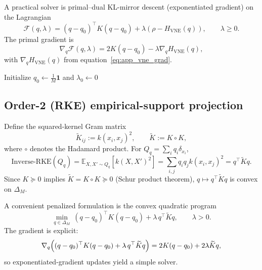 \documentclass{article}
\theoremstyle{plain}
\theoremstyle{definition}
\def\eqref#1{equation~\ref{#1}}
\begin{document}
\begin{appendices}
A practical solver is primal--dual KL-mirror descent (exponentiated gradient) on the Lagrangian
\[
\mathcal{F}(q,\lambda)=(q-q_0)^\top K(q-q_0)+\lambda(\rho-H_{\mathrm{VNE}}(q)),\qquad \lambda\ge 0.
\]
The primal gradient is
\[
\nabla_q\mathcal{F}(q,\lambda)=2K(q-q_0)-\lambda\nabla_q H_{\mathrm{VNE}}(q),
\]
with $\nabla_q H_{\mathrm{VNE}}(q)$ from \eqref{eq:app_vne_grad}.

\begin{algorithm}[t]
\caption{Empirical-support VNE projection (primal--dual exponentiated gradient)}
\label{alg:app_vne_proj}
Initialize $q_0\leftarrow \frac{1}{M}\mathbf{1}$ and $\lambda_0\leftarrow 0$\;
\;
\end{algorithm}

\subsection{Order-2 (RKE) empirical-support projection}

Define the squared-kernel Gram matrix
\[
\widetilde K_{ij}:=k(x_i,x_j)^2,
\qquad
\widetilde K:=K\circ K,
\]
where $\circ$ denotes the Hadamard product. For $Q_q=\sum_i q_i\delta_{x_i}$,
\begin{equation}\label{eq:app_irke_q}
\mathrm{Inverse\text{-}RKE}(Q_q)
=
\mathbb{E}_{X,X'\sim Q_q}[k(X,X')^2]
=
\sum_{i,j}q_i q_j k(x_i,x_j)^2
=
q^\top \widetilde K q.
\end{equation}
Since $K\succeq 0$ implies $\widetilde K=K\circ K\succeq 0$ (Schur product theorem), $q\mapsto q^\top \widetilde K q$ is convex on $\Delta_M$.

A convenient penalized formulation is the convex quadratic program
\begin{equation}\label{eq:app_rke_pen}
\min_{q\in\Delta_M}\ (q-q_0)^\top K(q-q_0)+\lambda\,q^\top \widetilde K q,
\qquad \lambda>0.
\end{equation}
The gradient is explicit:
\[
\nabla_q\Bigl((q-q_0)^\top K(q-q_0)+\lambda\,q^\top \widetilde K q\Bigr)=2K(q-q_0)+2\lambda \widetilde K q,
\]
so exponentiated-gradient updates yield a simple solver.


\end{appendices}
\end{document}

